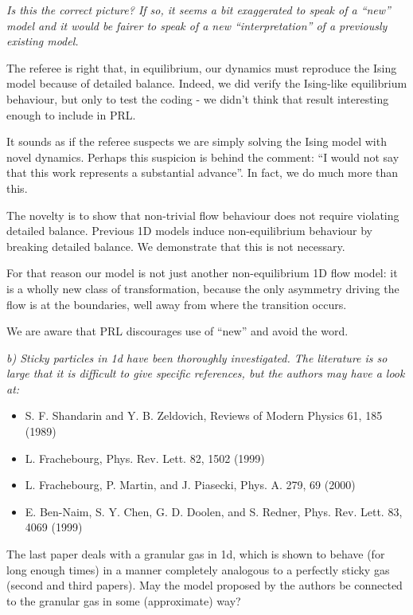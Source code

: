 \documentclass[a4paper,10pt]{article}
\begin{document}
{\it   Is this the correct picture? If so, it seems a bit exaggerated to
   speak of a ``new'' model and it would be fairer to speak of a new
   ``interpretation'' of a previously existing model.}
  

The referee is right that, in equilibrium, our dynamics must reproduce
the Ising model because of detailed balance.  Indeed, we did verify
the Ising-like equilibrium behaviour, but only to test the coding - we
didn't think that result interesting enough to include in PRL.

It sounds as if the referee suspects we are simply solving the
Ising model with novel dynamics.  Perhaps this suspicion is behind the comment: 
 ``I would not say that this work represents a substantial advance''.  
  In fact, we do much more than this.


  The novelty is to show that non-trivial flow behaviour does not require violating detailed balance.  Previous 1D models induce non-equilibrium behaviour by breaking detailed balance. We demonstrate that this is not necessary.
 
  For that reason our model is not just another non-equilibrium 1D flow model: it is a wholly new class of transformation, because the only asymmetry driving the flow is at the boundaries, well away from where the transition occurs.
 
  We are aware that PRL discourages use of ``new'' and avoid the word.
 
{\it   
   b) Sticky particles in 1d have been thoroughly investigated. The
   literature is so large that it is difficult to give specific
   references, but the authors may have a look at:
  \begin{itemize}
   \item S. F. Shandarin and Y. B. Zeldovich, Reviews of Modern Physics 61, 185 (1989)
   \item L. Frachebourg, Phys. Rev. Lett. 82, 1502 (1999)
   \item L. Frachebourg, P. Martin, and J. Piasecki, Phys. A. 279, 69 (2000)
   \item E. Ben-Naim, S. Y. Chen, G. D. Doolen, and S. Redner, Phys. Rev.
   Lett. 83, 4069 (1999)
  \end{itemize}
  
   The last paper deals with a granular gas in 1d, which is shown to
   behave (for long enough times) in a manner completely analogous to a
   perfectly sticky gas (second and third papers). May the model proposed
   by the authors be connected to the granular gas in some (approximate)
   way?}
\end{document}
